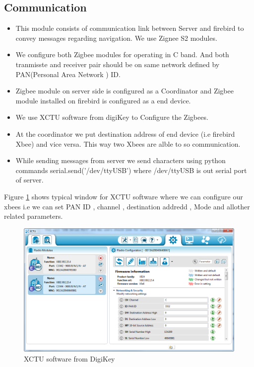 \documentclass[]{exam}
\begin{document}
\subsection{\color{red} Communication}
\begin{itemize}
\item This module consists of communication link between Server and firebird to convey messages regarding navigation. We use Zignee S2 modules. 
\item We configure both Zigbee modules for operating in C band. And both tranmisste and receiver pair should be on same network defined by PAN(Personal Area Network ) ID. 
\item Zigbee module on server side is configured as a Coordinator and Zigbee module installed on firebird is configured as a end device. 
\item We use XCTU software from digiKey to Configure the Zigbees. 
\item At the coordinator we put destination address of end device (i.e firebird Xbee) and vice versa. This way two Xbees are alble to so communication. 
\item While sending messages from server we send characters using python commands serial.send('/dev/ttyUSB') where /dev/ttyUSB is out serial port of server.   
\end{itemize}

Figure \ref{xctu} shows typical window for XCTU software where we can configure our xbees i.e we can set PAN ID , channel , destination addredd , Mode and allother related parameters. 
\begin{figure}[h!]


 \centering
 
  \includegraphics[scale=0.6]{xctu.png}
  \caption{XCTU software from DigiKey }
  \label{xctu}
  \end{figure}
  \newpage
\end{document}
